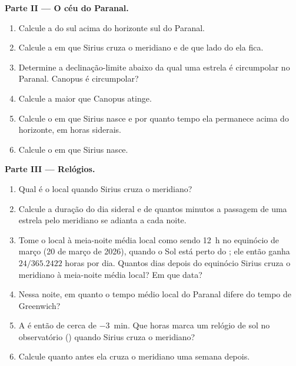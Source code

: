 \begin{problem}
\medskip
\noindent\textbf{Parte II --- O céu do Paranal.}
\begin{enumerate}[resume]
  \item Calcule a  do  sul acima do horizonte sul do Paranal.
  \item Calcule a  em que Sirius cruza o meridiano e de que lado do  ela fica.
  \item Determine a declinação-limite abaixo da qual uma estrela é circumpolar no Paranal. Canopus é circumpolar?
  \item Calcule a maior  que Canopus atinge.
  \item Calcule o  em que Sirius nasce e por quanto tempo ela permanece acima do horizonte, em horas siderais.
  \item Calcule o  em que Sirius nasce.
\end{enumerate}

\medskip
\noindent\textbf{Parte III --- Relógios.}
\begin{enumerate}[resume]
  \item Qual é o  local quando Sirius cruza o meridiano?
  \item Calcule a duração do dia sideral e de quantos minutos a passagem de uma estrela pelo meridiano se adianta a cada noite.
  \item Tome o  local à meia-noite média local como sendo \qty{12}{h} no equinócio de março (20 de março de 2026), quando o Sol está perto do ; ele então ganha $24/365.2422$ horas por dia. Quantos dias depois do equinócio Sirius cruza o meridiano à meia-noite média local? Em que data?
  \item Nessa noite, em quanto o tempo médio local do Paranal difere do tempo de Greenwich?
  \item A  é então de cerca de \qty{-3}{min}. Que horas marca um relógio de sol no observatório () quando Sirius cruza o meridiano?
  \item Calcule quanto antes ela cruza o meridiano uma semana depois.
\end{enumerate}


\end{problem}
